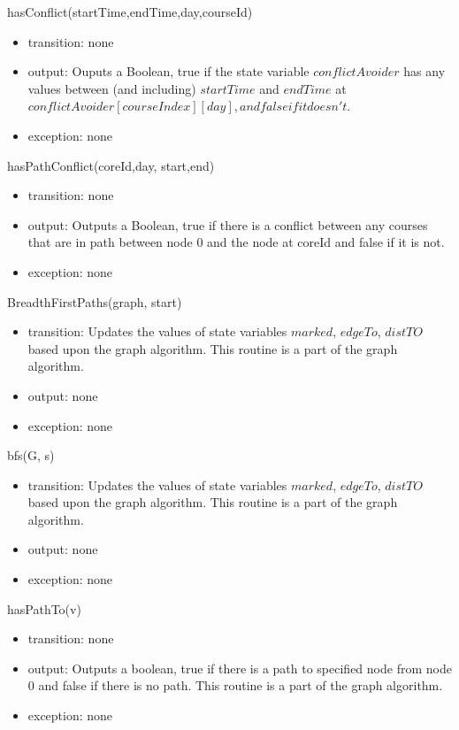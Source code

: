 \documentclass[11pt, oneside]{article}
\begin{document}
\noindent
hasConflict(startTime,endTime,day,courseId)
\begin{itemize}

\item transition: none
\item output: Ouputs a Boolean, true if the state variable $conflictAvoider$ has any values between (and including) $startTime$ and $endTime$ at $conflictAvoider[courseIndex][day], and false if it doesn't.$
 \item exception: none
\end{itemize}
\noindent
hasPathConflict(coreId,day, start,end)
\begin{itemize}
\item transition: none
\item output: Outputs a Boolean, true if there is a conflict between any courses that are in path between node 0 and the node at coreId and false if it is not.
 \item exception: none
\end{itemize}

\noindent
BreadthFirstPaths(graph, start)
\begin{itemize}
\item transition: Updates the values of state variables $marked$, $edgeTo$, $distTO$ based upon the graph algorithm. This routine is a part of the graph algorithm.
\item output: none
 \item exception: none
\end{itemize}

\noindent
bfs(G, s)
\begin{itemize}
\item transition: Updates the values of state variables $marked$, $edgeTo$, $distTO$ based upon the graph algorithm. This routine is a part of the graph algorithm.
\item output: none
 \item exception: none
\end{itemize}

\noindent
hasPathTo(v)
\begin{itemize}
\item transition: none
\item output: Outputs a boolean, true if there is a path to specified node from node 0 and false if there is no path. This routine is a part of the graph algorithm.
\item exception: none
\end{itemize}
\end{document}
